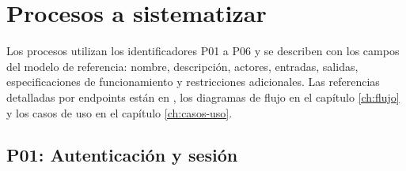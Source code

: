 \chapter{Procesos a sistematizar}
\label{ch:procesos}

Los procesos utilizan los identificadores P01 a P06 y se describen con los campos del modelo de referencia: nombre, descripción, actores, entradas, salidas, especificaciones de funcionamiento y restricciones adicionales. Las referencias detalladas por endpoints están en , los diagramas de flujo en el capítulo \ref{ch:flujo} y los casos de uso en el capítulo \ref{ch:casos-uso}.

\section{P01: Autenticación y sesión}

